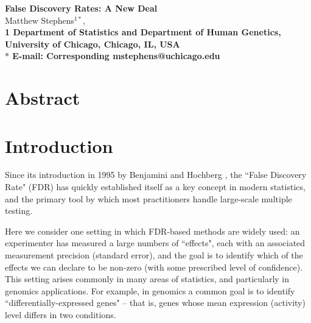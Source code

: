 \documentclass[11pt]{article}
\date{}
\begin{document}
\begin{flushleft}
{\Large
\textbf{False Discovery Rates: A New Deal}
}
\\
Matthew Stephens$^{1*}$, 
\\
\bf{1} Department of Statistics and Department of Human Genetics, University of Chicago, Chicago, IL, USA
\\
$\ast$ E-mail: Corresponding mstephens@uchicago.edu
\end{flushleft}

\section*{Abstract}


\section*{Introduction}

Since its introduction in 1995 by Benjamini and Hochberg 
\cite{benjamini1995controlling}, the ``False Discovery Rate" (FDR) has quickly established itself
as a key concept in modern statistics, and the primary tool by which most practitioners handle large-scale multiple testing.


Here we consider one setting in which FDR-based methods are widely used:
an experimenter has measured a large numbers of ``effects", each with an associated
measurement precision (standard error), 
and the goal is to identify which of the effects we can declare to be non-zero (with some prescribed level of confidence).
This setting arises commonly in many areas of statistics, and particularly in genomics applications.
For example, in genomics
a common goal is to identify ``differentially-expressed genes" -- that is, genes
whose mean expression (activity) level differs in two conditions. 


%
\end{document}
